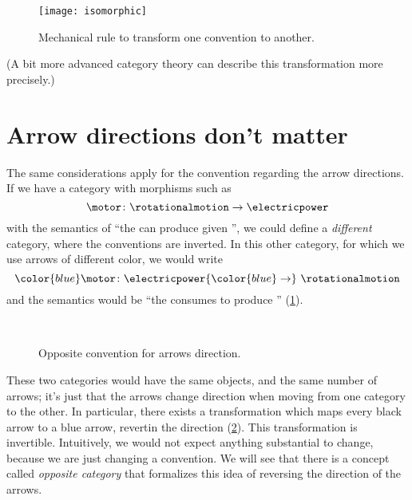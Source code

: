 \begin{figure}[h]
    \texttt{[image: isomorphic]}
    \caption{Mechanical rule to transform one convention to another.}
\end{figure}

(A bit more advanced category theory can describe this transformation more precisely.)

\section{Arrow directions don't matter}
The same considerations apply for the convention regarding the arrow directions.
If we have a category with morphisms such as
\begin{equation*}
    \motor \colon \rotationalmotion \to \electricpower
\end{equation*}
with the semantics of ``the \motor can produce \rotationalmotion given \electricpower'', we could define a \emph{different} category, where the conventions are inverted.
In this other category, for which we use arrows of different color, we would write
\begin{equation*}
    {\color{blue}\motor}
    \colon \electricpower {\color{blue} \to}\  \rotationalmotion
\end{equation*}
and the semantics would be ``the \motor consumes \electricpower to produce \rotationalmotion'' (\cref{fig:inverted}).

\begin{figure}[h!]
    \centering
    \\[+15pt]
    \caption{Opposite convention for arrows direction. }
    \label{fig:inverted}
\end{figure}

These two categories would have the same objects, and the same number of arrows; it's just that the arrows change direction when moving from one category to the other.
In particular, there exists a transformation which maps every black arrow to a blue arrow, revertin the direction (\cref{fig:inverted_2}).
This transformation is invertible.
Intuitively, we would not expect anything substantial to change, because we are just changing a convention.
We will see that there is a concept called \emph{opposite category} that formalizes this idea of reversing the direction of the arrows.

\begin{figure}[h!]
    \centering
    \caption{}
    \label{fig:inverted_2}
\end{figure}

